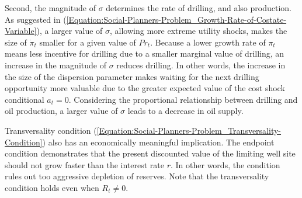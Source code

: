 Second, the magnitude of $\sigma$ determines the rate of drilling, and also production. As suggested in (\ref{Equation:Social-Planners-Problem_Growth-Rate-of-Costate-Variable}), a larger value of $\sigma$, allowing more extreme utility shocks, makes the size of $\dot{\pi}_{t}$ smaller for a given value of $Pr_{t}$. Because a lower growth rate of $\pi_{t}$ means less incentive for drilling due to a smaller marginal value of drilling, an increase in the magnitude of $\sigma$ reduces drilling. In other words, the increase in the size of the dispersion parameter makes waiting for the next drilling opportunity more valuable due to the greater expected value of the cost shock conditional $a_{t} = 0$. Considering the proportional relationship between drilling and oil production, a larger value of $\sigma$ leads to a decrease in oil supply. 

Transversality condition (\ref{Equation:Social-Planners-Problem_Transversality-Condition}) also has an economically meaningful implication. The endpoint condition demonstrates that the present discounted value of the limiting well site should not grow faster than the interest rate $r$. In other words, the condition rules out too aggressive depletion of reserves. Note that the transversality condition holds even when $R_{t} \neq 0$.
